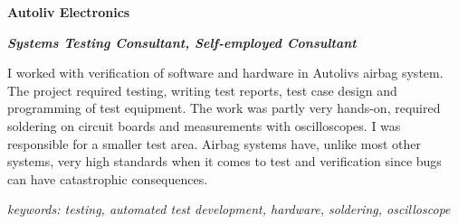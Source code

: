 \item[2004-2005] \textbf{Autoliv Electronics}

\textit{\textbf{Systems Testing Consultant, Self-employed Consultant}}

I worked with verification of software and hardware in Autolivs airbag system. The project required testing, writing test reports, test case design and programming of test equipment. The work was partly very hands-on, required soldering on circuit boards and measurements with oscilloscopes. I was responsible for a smaller test area. Airbag systems have, unlike most other systems, very high standards when it comes to test and verification since bugs can have catastrophic consequences.

\textit{keywords: testing, automated test development, hardware, soldering, oscilloscope}